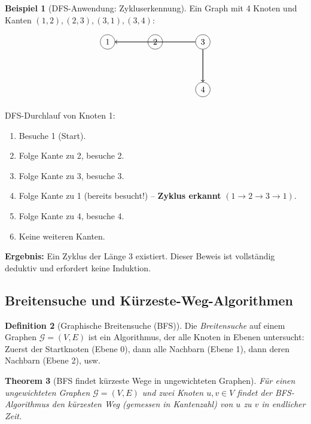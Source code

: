 \documentclass[12pt, a4paper]{article}
\newtheorem{theorem}{Theorem}[section]
\theoremstyle{definition}
\newtheorem{definition}[theorem]{Definition}
\newtheorem{example}[theorem]{Beispiel}
\theoremstyle{remark}
\newcommand{\Graph}{\mathcal{G}}
\begin{document}
\begin{example}[DFS-Anwendung: Zykluserkennung]
\label{ex:dfs_zyklen}
Ein Graph mit 4 Knoten und Kanten $(1,2), (2,3), (3,1), (3,4)$:

\[
\begin{tikzpicture}[node distance=2cm, auto]
  \node (1) [circle, draw] {1};
  \node (2) [circle, draw, right of=1] {2};
  \node (3) [circle, draw, right of=2] {3};
  \node (4) [circle, draw, below of=3] {4};
  
  \path[draw, ->, thick] (1) -- (2) -- (3) -- (1);
  \path[draw, ->, thick] (3) -- (4);
\end{tikzpicture}
\]

DFS-Durchlauf von Knoten 1:
\begin{enumerate}[label=(\alph*)]
  \item Besuche 1 (Start).
  \item Folge Kante zu 2, besuche 2.
  \item Folge Kante zu 3, besuche 3.
  \item Folge Kante zu 1 (bereits besucht!) -- \textbf{Zyklus erkannt} $(1 \to 2 \to 3 \to 1)$.
  \item Folge Kante zu 4, besuche 4.
  \item Keine weiteren Kanten.
\end{enumerate}

\textbf{Ergebnis:} Ein Zyklus der Länge 3 existiert. Dieser Beweis ist vollständig deduktiv und erfordert keine Induktion.
\end{example}

\subsection{Breitensuche und Kürzeste-Weg-Algorithmen}
\label{subsec:breitensuche}

\begin{definition}[Graphische Breitensuche (BFS)]
\label{def:bfs}
Die \emph{Breitensuche} auf einem Graphen $\Graph = (V, E)$ ist ein Algorithmus, der alle Knoten in Ebenen untersucht: Zuerst der Startknoten (Ebene 0), dann alle Nachbarn (Ebene 1), dann deren Nachbarn (Ebene 2), usw.
\end{definition}

\begin{theorem}[BFS findet kürzeste Wege in ungewichteten Graphen]
\label{thm:bfs_kuerzeste_wege}
Für einen ungewichteten Graphen $\Graph = (V, E)$ und zwei Knoten $u, v \in V$ findet der BFS-Algorithmus den kürzesten Weg (gemessen in Kantenzahl) von $u$ zu $v$ in endlicher Zeit.
\end{theorem}
\end{document}
